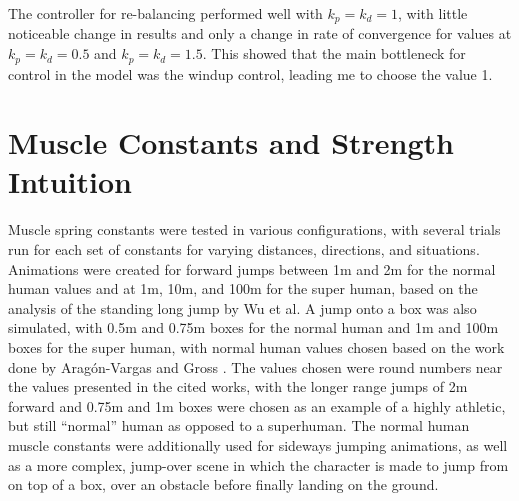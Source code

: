 The controller for re-balancing performed well with $k_p = k_d = 1$, with little noticeable change in results and only a change in rate of convergence for values at $k_p = k_d = 0.5$ and $k_p = k_d = 1.5$.  This showed that the main bottleneck for control in the model was the windup control, leading me to choose the value 1.

\section{Muscle Constants and Strength Intuition}
\label{section:muscle_results}

Muscle spring constants were tested in various configurations, with several trials run for each set of constants for varying distances, directions, and situations.  Animations were created for forward jumps between 1m and 2m for the normal human values and at 1m, 10m, and 100m for the super human, based on the analysis of the standing long jump by Wu et al\cite{longjump}.  A jump onto a box was also simulated, with 0.5m and 0.75m boxes for the normal human and 1m and 100m boxes for the super human, with normal human values chosen based on the work done by Arag\'{o}n-Vargas and Gross \cite{vertjump}.  The values chosen were round numbers near the values presented in the cited works, with the longer range jumps of 2m forward and 0.75m and 1m boxes were chosen as an example of a highly athletic, but still ``normal'' human as opposed to a superhuman.  The normal human muscle constants were additionally used for sideways jumping animations, as well as a more complex, jump-over scene in which the character is made to jump from on top of a box, over an obstacle before finally landing on the ground.

